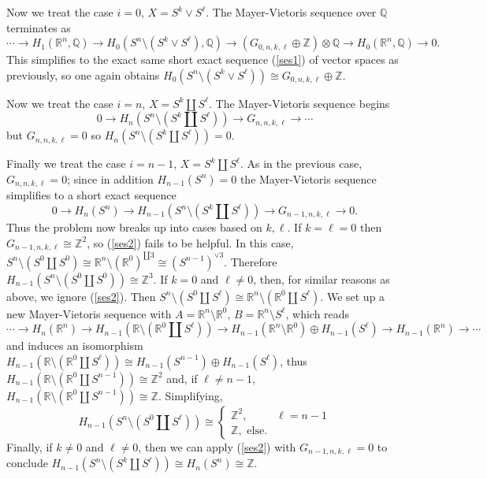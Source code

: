 \documentclass[10pt]{article}
\newcommand{\ZZ}{\mathbb{Z}}
\newcommand{\QQ}{\mathbb{Q}}
\newcommand{\RR}{\mathbb{R}}
\theoremstyle{definition}
\begin{document}
Now we treat the case $i = 0$, $X = S^k \vee S^\ell$.
The Mayer-Vietoris sequence over $\QQ$ terminates as
$$\cdots \to H_1(\RR^n, \QQ) \to H_0(S^n \setminus (S^k \vee S^\ell), \QQ) \to (G_{0,n,k,\ell} \oplus \ZZ) \otimes \QQ \to H_0(\RR^n, \QQ) \to 0.$$
This simplifies to the exact same short exact sequence (\ref{ses1}) of vector spaces as previously, so one again obtains $H_0(S^n \setminus (S^k \vee S^\ell)) \cong G_{0,n,k,\ell} \oplus \ZZ$.

Now we treat the case $i = n$, $X = S^k \amalg S^\ell$. The Mayer-Vietoris sequence begins
$$0 \to H_n(S^n \setminus (S^k \amalg S^\ell)) \to G_{n,n,k,\ell} \to \cdots$$
but $G_{n,n,k,\ell} = 0$ so $H_n(S^n \setminus (S^k \amalg S^\ell)) = 0$.

Finally we treat the case $i = n - 1$, $X = S^k \amalg S^\ell$. As in the previous case, $G_{n,n,k,\ell} = 0$; since in addition $H_{n-1}(S^n) = 0$ the Mayer-Vietoris sequence simplifies to a short exact sequence
\begin{equation}
\label{ses2}
0 \to H_n(S^n) \to H_{n-1}(S^n \setminus (S^k \amalg S^\ell)) \to G_{n-1,n,k,\ell} \to 0.
\end{equation}
Thus the problem now breaks up into cases based on $k,\ell$. If $k = \ell = 0$ then $G_{n-1,n,k,\ell} \cong \ZZ^2$, so (\ref{ses2}) fails to be helpful.
In this case, $S^n \setminus (S^0 \amalg S^0) \cong \RR^n \setminus (\RR^0)^{\amalg 3} \cong (S^{n-1})^{\vee 3}$.
Therefore $H_{n-1}(S^n \setminus (S^0 \amalg S^0)) \cong \ZZ^3$.
If $k = 0$ and $\ell \neq 0$, then, for similar reasons as above, we ignore (\ref{ses2}).
Then $S^n \setminus (S^0 \amalg S^\ell) \cong \RR^n \setminus (\RR^0 \amalg S^\ell)$.
We set up a new Mayer-Vietoris sequence with $A = \RR^n \setminus \RR^0$, $B = \RR^n \setminus S^\ell$, which reads
$$\cdots \to H_n(\RR^n) \to H_{n-1}(\RR \setminus (\RR^0 \amalg S^\ell)) \to H_{n-1}(\RR^n \setminus \RR^0) \oplus H_{n-1}(S^\ell) \to H_{n-1}(\RR^n) \to \cdots$$
and induces an isomorphism $H_{n-1}(\RR \setminus (\RR^0 \amalg S^\ell)) \cong H_{n-1}(S^{n-1}) \oplus H_{n-1}(S^\ell)$,
thus $H_{n-1}(\RR \setminus (\RR^0 \amalg S^{n-1})) \cong \ZZ^2$ and, if $\ell \neq n - 1$, $H_{n-1}(\RR \setminus (\RR^0 \amalg S^{n-1})) \cong \ZZ$.
Simplifying,
$$H_{n-1}(S^n \setminus (S^0 \amalg S^\ell)) \cong \begin{cases}
\ZZ^2, &\ell = n - 1\\
\ZZ, \text{ else}.
\end{cases}$$
Finally, if $k \neq 0$ and $\ell \neq 0$, then we can apply (\ref{ses2}) with $G_{n-1,n,k,\ell} = 0$ to conclude $H_{n-1}(S^n \setminus (S^k \amalg S^\ell)) \cong H_n(S^n) \cong \ZZ$.
\end{document}
